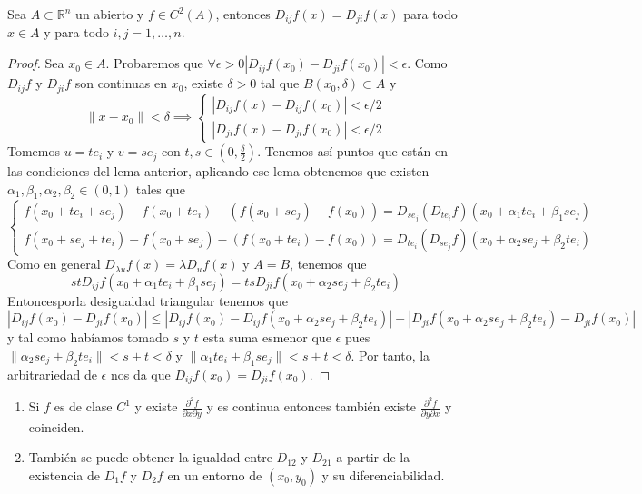 \begin{teorema}
    Sea $A \subset \mathbb{R}^n$ un abierto y $f \in C^2(A)$, entonces $D_{ij}f(x) = D_{ji}f(x)$ para todo $x \in A$ y para todo $i, j = 1, \ldots, n$. 
\end{teorema}
\begin{proof}
    Sea $x_0 \in A$. Probaremos que $\forall \epsilon > 0 |D_{ij}f(x_0) - D_{ji}f(x_0)| < \epsilon$. Como $D_{ij}f$ y $D_{ji}f$ son continuas en $x_0$, existe $\delta > 0$ tal que $B(x_0, \delta) \subset A$ y 
    $$\|x -x_0\| < \delta \implies \begin{cases}
        |D_{ij}f(x) - D_{ij}f(x_0)| < \epsilon/2 \\
        |D_{ji}f(x) - D_{ji}f(x_0)| < \epsilon/2
    \end{cases}$$
    Tomemos $u = te_i$ y $v = se_j$ con $t, s \in (0, \frac{\delta}{2})$. Tenemos así puntos que están en las condiciones del lema anterior, aplicando ese lema obtenemos que existen $\alpha_1, \beta_1, \alpha_2, \beta_2 \in (0,1)$ tales que
    $$\begin{cases}
            f(x_0 + te_i + se_j) - f(x_0 + te_i) - (f(x_0 + se_j) - f(x_0)) = D_{se_j}(D_{te_i}f)(x_0 + \alpha_1 te_i + \beta_1 se_j)\\
            f(x_0 + se_j + te_i) - f(x_0 + se_j) - (f(x_0 + te_i) - f(x_0)) = D_{te_i}(D_{se_j}f)(x_0 + \alpha_2 se_j + \beta_2 te_i)
    \end{cases}$$
    Como en general $D_{\lambda u}f(x) = \lambda D_u f(x)$ y $A = B$, tenemos que 
    $$st D_{ij}f(x_0 + \alpha_1 te_i + \beta_1 se_j) = ts D_{ji}f(x_0 + \alpha_2 se_j + \beta_2 te_i)$$
    Entoncesporla desigualdad triangular tenemos que
    $$|D_{ij}f(x_0) - D_{ji}f(x_0)| \leq |D_{ij}f(x_0) - D_{ij}f(x_0 + \alpha_2 se_j + \beta_2 te_i)| + |D_{ji}f(x_0 + \alpha_2 se_j + \beta_2 te_i) - D_{ji}f(x_0)|$$
    y tal como habíamos tomado $s$ y $t$ esta suma esmenor que $\epsilon$ pues $\|\alpha_2 s e_j +\beta_2 t e_i\| < s + t < \delta$ y $\|\alpha_1 t e_i + \beta_1 s e_j\| < s + t < \delta$. Por tanto, la arbitrariedad de $\epsilon$ nos da que $D_{ij}f(x_0) = D_{ji}f(x_0)$. 
\end{proof}
\begin{observación}
    \begin{enumerate}
        \item Si $f$ es de clase $C^1$ y existe $\frac{\partial^2 f}{\partial x \partial y}$ y es continua entonces también existe $\frac{\partial^2 f}{\partial y \partial x}$ y coinciden.
        \item También se puede obtener la igualdad entre $D_{12}$ y $D_{21}$ a partir de la existencia de $D_1f$ y $D_2f$ en un entorno de $(x_0, y_0)$ y su diferenciabilidad.
    \end{enumerate}
\end{observación}

